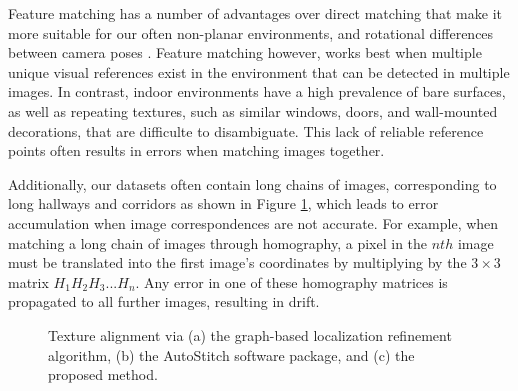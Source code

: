 \documentclass[]{spie}  %
\begin{document}
Feature matching has a number of advantages over direct matching that
make it more suitable for our often non-planar environments, and
rotational differences between camera poses
\cite{szeliski2006image}. Feature matching however, works best when
multiple unique visual references exist in the environment that can be
detected in multiple images. In contrast, indoor environments have a
high prevalence of bare surfaces, as well as repeating textures, such
as similar windows, doors, and wall-mounted decorations, that are
difficulte to disambiguate. This lack of reliable reference points
often results in errors when matching images together.

Additionally, our datasets often contain long chains of images,
corresponding to long hallways and corridors as shown in Figure
\ref{fig:mosaic3D}, which leads to error accumulation when image
correspondences are not accurate. For example, when matching a long
chain of images through homography, a pixel in the $nth$ image must be
translated into the first image's coordinates by multiplying by the
$3\times3$ matrix $H_1 H_2 H_3 ... H_n$. Any error in one of these
homography matrices is propagated to all further images, resulting in
drift.

\begin{figure}
  \centering {}

  \centering {}

  \centering {}

  \caption{Texture alignment via (a) the graph-based localization
    refinement algorithm, (b) the AutoStitch software package, and (c)
    the proposed method.}
  \label{fig:mosaic3D}
\end{figure}
\end{document}
